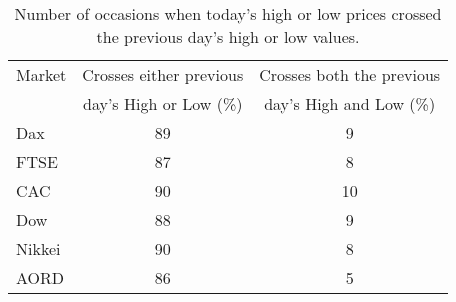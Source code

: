 \begin{table}[!htbp] \centering 
  \caption[Today's H/L Prices in relation to previous day's HL.]{Number of occasions when today's high or low prices crossed the previous day's high or low values.} 
  \label{tab:highlow}
\begin{tabular}{lcc } 
\toprule 
Market & Crosses either previous    & Crosses both the previous \\ 
       & day's High or Low (\%)     &  day's High and Low (\%)       \\
\midrule 
Dax  & 89  & 9  \\ 
FTSE & 87  & 8  \\ 
CAC  & 90  & 10 \\ 
Dow  & 88  & 9  \\ 
Nikkei & 90 & 8 \\ 
AORD   & 86 & 5 \\
\bottomrule 
\end{tabular} 
\end{table} 


